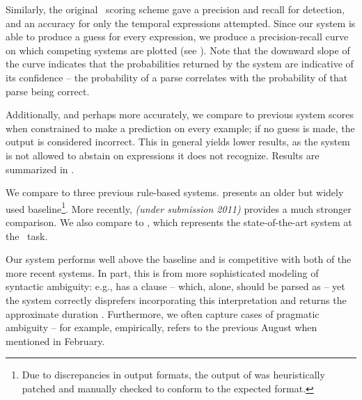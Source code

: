 
Similarly, the original \tempeval\ scoring scheme gave a precision 
	and recall for detection, and an accuracy for only the temporal expressions 
	attempted.
Since our system is able to produce a guess for every expression, we produce
	a precision-recall curve on which competing systems are plotted
	(see ).
Note that the downward slope of the curve indicates that the probabilities
	returned by the system are indicative of its confidence -- the probability
	of a parse correlates with the probability of that parse being correct.

Additionally, and perhaps more accurately, we compare to 
	previous system scores when constrained to make a prediction on every
	example; if no guess is made, the output is considered incorrect.
This in general yields lower results, as the system is not allowed to
	abstain on expressions it does not recognize.
Results are summarized in .

We compare to three previous rule-based systems.
 \cite{key:2000mani-temporal} presents an older but widely
	used baseline\footnote{
		Due to discrepancies in output formats, 
			the output of  was heuristically patched
			and manually checked to conform to the expected format.
	}.
More recently,  \textit{(under submission 2011)} 
	provides a much stronger comparison.
We also compare to  \cite{key:2010strotgen-temporal}, 
	which represents the state-of-the-art system at the \tempeval\ task.

Our system performs well above the  baseline and is competitive
	with both of the more recent systems.
In part, this is from more sophisticated modeling of syntactic ambiguity:
	e.g.,  has a clause  -- which, alone,
	should be parsed as  -- yet the system correctly disprefers
	incorporating this interpretation and 
	returns the approximate duration .
Furthermore, we often capture cases of pragmatic ambiguity -- for example,
	empirically,  refers to the previous August when mentioned in
	February.



